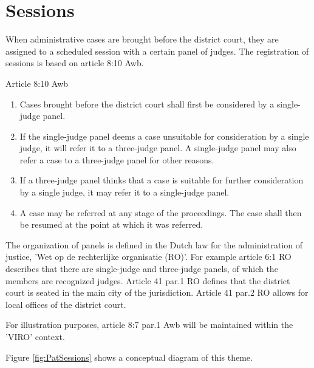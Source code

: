 \documentclass[10pt,a4paper]{report}              %
\theoremstyle{plain}\theorembodyfont{\rmfamily}\newtheorem{definition}{Definition}[section]
\theoremstyle{plain}\theorembodyfont{\rmfamily}\newtheorem{designrule}[definition]{Requirement}
\begin{document}
\section{Sessions}

When administrative cases are brought before the district court, they
are assigned to a scheduled session with a certain panel of judges. The
registration of sessions is based on article 8:10 Awb.

Article 8:10 Awb

\begin{enumerate}[1.]
\item
  Cases brought before the district court shall first be considered by a
  single-judge panel.
\item
  If the single-judge panel deems a case unsuitable for consideration by
  a single judge, it will refer it to a three-judge panel. A
  single-judge panel may also refer a case to a three-judge panel for
  other reasons.
\item
  If a three-judge panel thinks that a case is suitable for further
  consideration by a single judge, it may refer it to a single-judge
  panel.
\item
  A case may be referred at any stage of the proceedings. The case shall
  then be resumed at the point at which it was referred.
\end{enumerate}
The organization of panels is defined in the Dutch law for the
administration of justice, 'Wet op de rechterlijke organisatie (RO)'.
For example article 6:1 RO describes that there are single-judge and
three-judge panels, of which the members are recognized judges. Article
41 par.1 RO defines that the district court is seated in the main city
of the jurisdiction. Article 41 par.2 RO allows for local offices of the
district court.

For illustration purposes, article 8:7 par.1 Awb will be maintained
within the 'VIRO' context.

Figure \ref{fig:PatSessions} shows a conceptual diagram of this theme.
\end{document}
